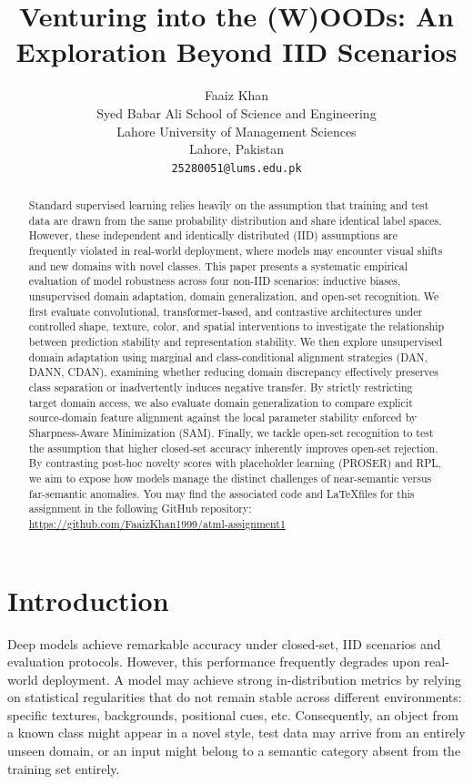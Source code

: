 \documentclass{article}
\title{Venturing into the (W)OODs: An Exploration Beyond IID Scenarios}
\author{
  Faaiz Khan \\
  Syed Babar Ali School of Science and Engineering\\
  Lahore University of Management Sciences\\
  Lahore, Pakistan\\
  \texttt{25280051@lums.edu.pk} \\
}
\begin{document}
\maketitle

\begin{abstract}
  Standard supervised learning relies heavily on the assumption that training and test data are drawn from the same probability distribution and share identical label spaces. However, these independent and identically distributed (IID) assumptions are frequently violated in real-world deployment, where models may encounter visual shifts and new domains with novel classes. This paper presents a systematic empirical evaluation of model robustness across four non-IID scenarios: inductive biases, unsupervised domain adaptation, domain generalization, and open-set recognition. We first evaluate convolutional, transformer-based, and contrastive architectures under controlled shape, texture, color, and spatial interventions to investigate the relationship between prediction stability and representation stability. We then explore unsupervised domain adaptation using marginal and class-conditional alignment strategies (DAN, DANN, CDAN), examining whether reducing domain discrepancy effectively preserves class separation or inadvertently induces negative transfer. By strictly restricting target domain access, we also evaluate domain generalization to compare explicit source-domain feature alignment against the local parameter stability enforced by Sharpness-Aware Minimization (SAM). Finally, we tackle open-set recognition to test the assumption that higher closed-set accuracy inherently improves open-set rejection. By contrasting post-hoc novelty scores with placeholder learning (PROSER) and RPL, we aim to expose how models manage the distinct challenges of near-semantic versus far-semantic anomalies. You may find the associated code and \LaTeX files for this assignment in the following GitHub repository: \url{https://github.com/FaaizKhan1999/atml-assignment1}
\end{abstract}

\section{Introduction}

Deep models achieve remarkable accuracy under closed-set, IID scenarios and evaluation protocols. However, this performance frequently degrades upon real-world deployment. A model may achieve strong in-distribution metrics by relying on statistical regularities that do not remain stable across different environments: specific textures, backgrounds, positional cues, etc. Consequently, an object from a known class might appear in a novel style, test data may arrive from an entirely unseen domain, or an input might belong to a semantic category absent from the training set entirely.
\end{document}
